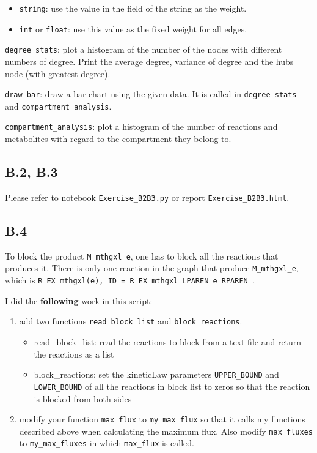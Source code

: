 \documentclass[]{article}
\begin{document}
\begin{itemize}
\item
  \texttt{string}: use the value in the field of the string as the
  weight.
\item
  \texttt{int} or \texttt{float}: use this value as the fixed weight for
  all edges.
\end{itemize}

\texttt{degree\_stats}: plot a histogram of the number of the nodes with
different numbers of degree. Print the average degree, variance of
degree and the hubs node (with greatest degree).

\texttt{draw\_bar}: draw a bar chart using the given data. It is called
in \texttt{degree\_stats} and \texttt{compartment\_analysis}.

\texttt{compartment\_analysis}: plot a histogram of the number of
reactions and metabolites with regard to the compartment they belong to.

\hypertarget{header-n153}{%
\subsection{B.2, B.3}\label{header-n153}}

Please refer to notebook \texttt{Exercise\_B2B3.py} or report
\texttt{Exercise\_B2B3.html}.

\hypertarget{header-n156}{%
\subsection{B.4}\label{header-n156}}

To block the product \texttt{M\_mthgxl\_e}, one has to block all the
reactions that produces it. There is only one reaction in the graph that
produce \texttt{M\_mthgxl\_e}, which is
\texttt{R\_EX\_mthgxl(e),\ ID\ =\ R\_EX\_mthgxl\_LPAREN\_e\_RPAREN\_}.

I did the \textbf{following} work in this script:

\begin{enumerate}
\def\labelenumi{\arabic{enumi}.}
\item
  add two functions \texttt{read\_block\_list} and
  \texttt{block\_reactions}.

  \begin{itemize}
  \item
    read\_block\_list: read the reactions to block from a text file and
    return the reactions as a list
  \item
    block\_reactions: set the kineticLaw parameters
    \texttt{UPPER\_BOUND} and \texttt{LOWER\_BOUND} of all the reactions
    in block list to zeros so that the reaction is blocked from both
    sides
  \end{itemize}
\item
  modify your function \texttt{max\_flux} to \texttt{my\_max\_flux} so
  that it calls my functions described above when calculating the
  maximum flux. Also modify \texttt{max\_fluxes} to
  \texttt{my\_max\_fluxes} in which \texttt{max\_flux} is called.
\end{enumerate}
\end{document}
